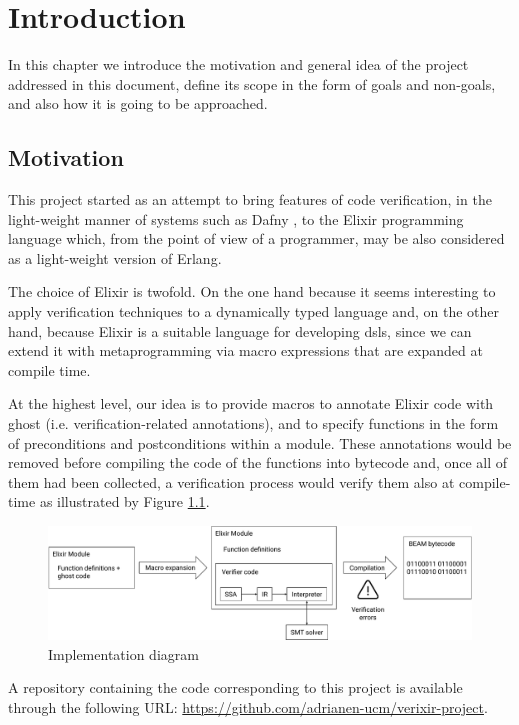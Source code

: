 \chapter{Introduction}
\label{cap:introduction}

In this chapter we introduce the motivation and general idea of the project
addressed in this document, define its scope in the form of goals and non-goals,
and also how it is going to be approached.

\section{Motivation}

This project started as an attempt to bring features of code verification, in
the light-weight manner of systems such as Dafny \citep{DafnyManual}, to the
Elixir programming language which, from the point of view of a programmer, may
be also considered as a light-weight version of Erlang.

The choice of Elixir is twofold. On the one hand because it seems interesting to
apply verification techniques to a dynamically typed language and, on the other
hand, because Elixir is a suitable language for developing \gls{dsl}s, since we
can extend it with metaprogramming via macro expressions that are expanded at
compile time.

At the highest level, our idea is to provide macros to annotate Elixir code with
ghost (i.e. verification-related annotations), and to specify functions in the
form of preconditions and postconditions within a module. These annotations
would be removed before compiling the code of the functions into bytecode and,
once all of them had been collected, a verification process would verify them
also at compile-time as illustrated by Figure \ref{fig:diag}.

\begin{figure}[h]
\includegraphics[width=\textwidth]{Images/Vectorial/Diagram}
\caption{Implementation diagram}
\label{fig:diag}
\end{figure}

A repository containing the code corresponding to this project is available
through the following URL:
\url{https://github.com/adrianen-ucm/verixir-project}.

